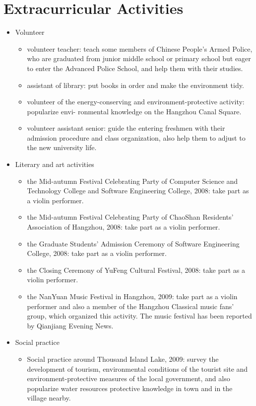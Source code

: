 \documentclass[letterpaper]{article}
\begin{document}
\section*{Extracurricular Activities}
\begin{itemize}
\item Volunteer
    \begin{itemize}
    \item volunteer teacher: teach some members of Chinese People's Armed Police, who are graduated from junior middle school or primary school but eager to enter the Advanced Police School, and help them with their studies.
    \item assistant of library: put books in order and make the environment tidy.
    \item volunteer of the energy-conserving and environment-protective activity: popularize envi-
ronmental knowledge on the Hangzhou Canal Square.
	\item volunteer assistant senior: guide the entering freshmen with their admission procedure
and class organization, also help them to adjust to the new university life.
    \end{itemize}
\item Literary and art activities
   \begin{itemize}
    \item the Mid-autumn Festival Celebrating Party of Computer Science and Technology College
and Software Engineering College, 2008: take part as a violin performer.
    \item the Mid-autumn Festival Celebrating Party of ChaoShan Residents’ Association of Hangzhou,
2008: take part as a violin performer.
    \item the Graduate Students’ Admission Ceremony of Software Engineering College, 2008: take
part as a violin performer.
	\item the Closing Ceremony of YuFeng Cultural Festival, 2008: take part as a violin performer.
	\item the NanYuan Music Festival in Hangzhou, 2009: take part as a violin performer and also
a member of the Hangzhou Classical music fans’ group, which organized this activity. The music festival has been reported by Qianjiang Evening News.
  \end{itemize}
\item Social practice
    \begin{itemize}
    \item Social practice around Thousand Island Lake, 2009: survey the development of tourism, environmental conditions of the tourist site and environment-protective measures of the local government, and also popularize water resources protective knowledge in town and in the village nearby.
    \end{itemize}
\end{itemize}
\end{document}
